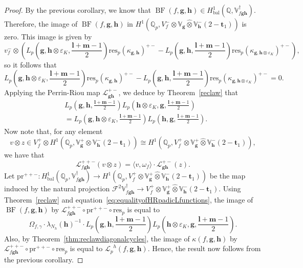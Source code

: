 \documentclass[10pt,a4paper]{amsart}
\DeclareMathOperator{\BF}{BF}
\newcommand{\Lp}{{\mathscr{L}_p}}
\DeclareMathOperator{\bal}{bal}
\newcommand{\bb}{\mathbb}
\newcommand{\cl}{\mathcal}
\newcommand{\hg}{{\mathbf{g}}}
\newcommand{\hh}{{\mathbf h}}
\newcommand{\res}{\mathrm{res}}
\begin{document}
\begin{proof}
    By the previous corollary, we know that $\BF(f,\hg,\hh)\in H^1_{\bal}(\bb{Q},\bb{V}_{f\hg\hh}^\dagger)$. Therefore, the image of $\BF(f,\hg,\hh)$ in $H^1(\bb{Q}_p,V_f^-\otimes\bb{V}_{\hg}\hat{\otimes}\bb{V}_{\hh}^{-}(2-\mathbf{t}_1))$ is zero. This image is given by
    \[
    v_f^-\otimes \left(L_p\left(\hg,\hh\otimes\varepsilon_K,\frac{\mathbf{l}+\mathbf{m}-1}{2}\right)\res_p(\kappa_{\hg,\hh})^{+-}-L_p\left(\hg,\hh,\frac{\mathbf{l}+\mathbf{m}-1}{2}\right)\res_p(\kappa_{\hg,\hh\otimes\varepsilon_K})^{+-}\right),
    \]
    so it follows that
    \[
    L_p\left(\hg,\hh\otimes\varepsilon_K,\frac{\mathbf{l}+\mathbf{m}-1}{2}\right)\res_p(\kappa_{\hg,\hh})^{+-}-L_p\left(\hg,\hh,\frac{\mathbf{l}+\mathbf{m}-1}{2}\right)\res_p(\kappa_{\hg,\hh\otimes\varepsilon_K})^{+-}=0.
    \]
    Applying the Perrin-Riou map $\mathcal{L}_{\hg\hh}^{+-}$, we deduce by Theorem~\ref{reclaw} that
    \begin{align}
    &L_p\left(\hg,\hh,\frac{\mathbf{l}+\mathbf{m}-1}{2}\right)L_p\left(\hh\otimes\varepsilon_K,\hg,\frac{\mathbf{l}+\mathbf{m}-1}{2}\right) \nonumber \\
    &=L_p\left(\hg,\hh\otimes\varepsilon_K,\frac{\mathbf{l}+\mathbf{m}-1}{2}\right)L_p\left(\hh,\hg,\frac{\mathbf{l}+\mathbf{m}-1}{2}\right). \label{eq:equalityofHRpadicLfunctions}
    \end{align}
    Now note that, for any element
    \[
    v\otimes z \in V_f^+ \otimes H^1(\bb{Q}_p,\bb{V}_\hg^+\hat{\otimes} \bb{V}_\hh^-(2-\mathbf{t}_1))\cong H^1(\bb{Q}_p,V_f^+\otimes \bb{V}_{\hg}^+\hat{\otimes}\bb{V}_{\hh}^-(2-\mathbf{t}_1)),
    \]
    we have that
    \[
    \mathcal{L}_{f\hg\hh}^{++-}(v\otimes z)=\langle v,\omega_f\rangle \cdot\mathcal{L}_{\hg\hh}^{+-}(z).
    \]
    Let $\mathrm{pr}^{++-}:H^1_{\bal}(\bb{Q}_p,\bb{V}_{f\hg\hh}^\dagger)\rightarrow H^1(\bb{Q}_p,V_f^+\otimes\bb{V}_\hg^+\hat{\otimes}\bb{V}_\hh^-(2-\mathbf{t}_1))$ be the map induced by the natural projection $\mathscr{F}^2\bb{V}_{f\hg\hh}^\dagger\rightarrow V_f^+\otimes\bb{V}_\hg^+\hat{\otimes}\bb{V}_\hh^-(2-\mathbf{t}_1)$. Using Theorem~\ref{reclaw} and equation~\ref{eq:equalityofHRpadicLfunctions}, the image of $\BF(f,\hg,\hh)$ by $\cl{L}_{f\hg\hh}^{++-}\circ \mathrm{pr}^{++-}\circ \res_p$ is equal to
    \[
    \Omega_{f,\gamma}\cdot\lambda_{N_h}(\hh)^{-1}\cdot L_p\left(\hg,\hh,\frac{\mathbf{l}+\mathbf{m}-1}{2}\right)L_p\left(\hh\otimes\varepsilon_K,\hg,\frac{\mathbf{l}+\mathbf{m}-1}{2}\right).
    \]
    Also, by Theorem~\ref{thm:reclawdiagonalcycles}, the image of $\kappa(f,\hg,\hh)$ by $\cl{L}_{f\hg\hh}^{++-}\circ \mathrm{pr}^{++-}\circ \res_p$ is equal to $\Lp^h(f,\hg,\hh)$. Hence, the result now follows from the previous corollary.
    
\end{proof}
\end{document}
